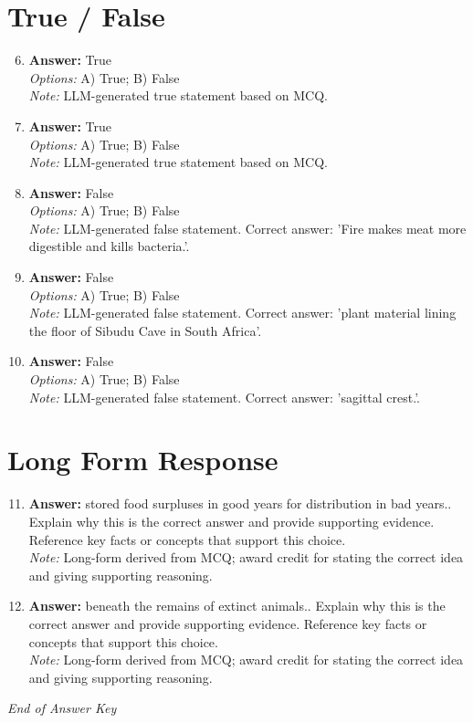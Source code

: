\documentclass[12pt]{article}
\begin{document}
\section*{True / False}
\begin{enumerate}[label=\arabic*.]
\setcounter{enumi}{5}
\item \textbf{Answer:} True
\\ \textit{Options:} A) True; B) False
\\ \textit{Note:} LLM-generated true statement based on MCQ.
\item \textbf{Answer:} True
\\ \textit{Options:} A) True; B) False
\\ \textit{Note:} LLM-generated true statement based on MCQ.
\item \textbf{Answer:} False
\\ \textit{Options:} A) True; B) False
\\ \textit{Note:} LLM-generated false statement. Correct answer: 'Fire makes meat more digestible and kills bacteria.'.
\item \textbf{Answer:} False
\\ \textit{Options:} A) True; B) False
\\ \textit{Note:} LLM-generated false statement. Correct answer: 'plant material lining the floor of Sibudu Cave in South Africa'.
\item \textbf{Answer:} False
\\ \textit{Options:} A) True; B) False
\\ \textit{Note:} LLM-generated false statement. Correct answer: 'sagittal crest.'.
\end{enumerate}

\section*{Long Form Response}
\begin{enumerate}[label=\arabic*.]
\setcounter{enumi}{10}
\item \textbf{Answer:} stored food surpluses in good years for distribution in bad years.. Explain why this is
the correct answer and provide supporting evidence. Reference key facts or concepts that
support this choice.
\\ \textit{Note:} Long-form derived from MCQ; award credit for stating the correct idea and giving supporting reasoning.
\item \textbf{Answer:} beneath the remains of extinct animals.. Explain why this is the correct answer and
provide supporting evidence. Reference key facts or concepts that support this choice.
\\ \textit{Note:} Long-form derived from MCQ; award credit for stating the correct idea and giving supporting reasoning.
\end{enumerate}

\vfill
\noindent\textit{End of Answer Key}
\end{document}
